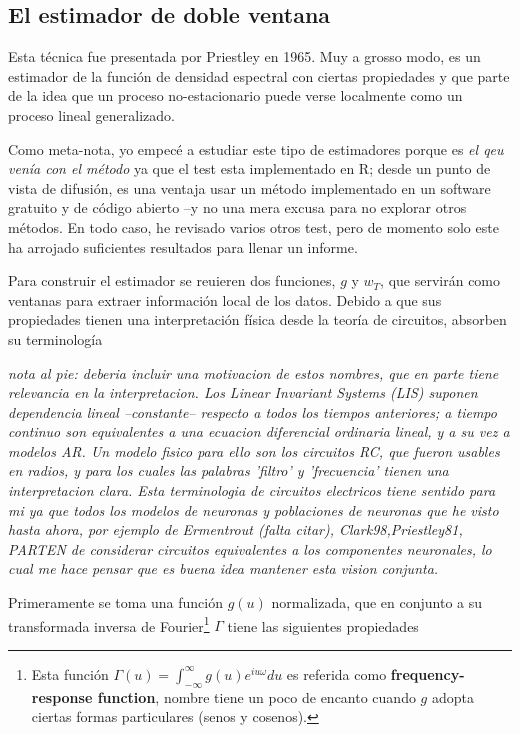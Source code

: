 \subsection{El estimador de doble ventana}

Esta t\'ecnica fue presentada por Priestley en 1965. Muy a grosso modo, es un estimador de la
funci\'on de densidad espectral con ciertas propiedades y que parte de la idea que un proceso
no-estacionario puede verse localmente como un proceso lineal generalizado.

Como meta-nota, yo empec\'e a estudiar este tipo de estimadores porque es \textit{el qeu ven\'ia
con el m\'etodo} ya que el test esta implementado en R; desde un punto de vista de difusi\'on,
es una ventaja usar un m\'etodo implementado en un software gratuito y de c\'odigo abierto --y
no una mera excusa para no explorar otros m\'etodos. En todo caso, he revisado varios otros test,
pero de momento solo este ha arrojado suficientes resultados para llenar un informe.

Para construir el estimador se reuieren dos funciones, $g$ y $w_T$, que servir\'an como ventanas
para extraer informaci\'on local de los datos. Debido a que sus propiedades tienen una interpretaci\'on
f\'isica desde la teor\'ia de circuitos, absorben su terminolog\'ia

\textit{
nota al pie: deberia incluir una motivacion de estos nombres,
que en parte tiene relevancia en la interpretacion. Los 
Linear Invariant Systems (LIS) suponen dependencia lineal
--constante-- respecto a todos los tiempos anteriores; 
a tiempo continuo son equivalentes a una ecuacion diferencial ordinaria lineal,
y a su vez a modelos AR. Un modelo fisico para ello son los circuitos RC, que
fueron usables en radios, y para los cuales las palabras 'filtro' y 'frecuencia'
tienen una interpretacion clara. Esta terminologia de circuitos electricos tiene sentido
para mi ya que todos los modelos de neuronas y poblaciones de neuronas que he visto hasta ahora,
por ejemplo de Ermentrout (falta citar), {Clark98,Priestley81}, PARTEN de considerar
circuitos equivalentes a los componentes neuronales, lo cual me hace pensar que es buena idea
mantener esta vision conjunta.
}

Primeramente se toma una funci\'on $g(u)$ normalizada, que en conjunto a su
transformada inversa de Fourier\footnote{Esta funci\'on 
$\Gamma(u) = \int_{-\infty}^{\infty} g(u) e^{i u \omega} du$
es referida como
\textbf{frequency-response function}, nombre tiene un poco de encanto cuando
$g$ adopta ciertas formas particulares (senos y cosenos).} 
$\Gamma$ tiene las siguientes propiedades

